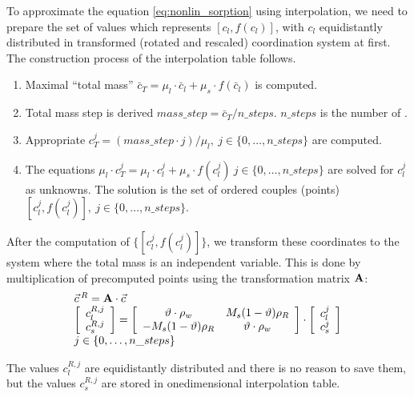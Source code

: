 To approximate the equation \eqref{eq:nonlin_sorption} using interpolation, we need to prepare the set of values 
which represents $[c_l, f(c_l)]$, with $c_l$ equidistantly distributed in transformed (rotated and rescaled) 
coordination system at first. The construction process of the interpolation table follows.
\begin{enumerate}
 \item Maximal ``total mass'' $\bar{c}_T = \mu_l\cdot \bar{c}_l + \mu_s\cdot f(\bar{c}_l)$ is computed.
 \item Total mass step is derived $mass\_step = \bar{c}_T/n\_steps$. $n\_steps$ is the number of
       .
 \item Appropriate $c_T^j = (mass\_step\cdot j)/\mu_l,~j\in \{0,\ldots, n\_steps\}$ are computed. 
 \item The equations $\mu_l \cdot c_T^j = \mu_l\cdot c_l^j + \mu_s\cdot f(c_l^j)~j\in \{0,\ldots, n\_steps\}$ are solved 
       for $c_l^j$ as unknowns. The solution is the set of ordered couples (points) 
       $[c_l^j,f(c_l^j)],~j\in\{0,\ldots,n\_steps\}$.
\end{enumerate}
After the computation of $\{[c_l^j,f(c_l^j)]\}$, we transform these coordinates to the system where the total mass is 
an independent variable. This is done by multiplication of precomputed points using the transformation matrix ${\bf A}$:
\begin{equation}
 \begin{array}{l}
  \vec{c}\,^R = {\bf A}\cdot\vec{c}\\
  \left[\begin{array}{c} c_l^{R,j}\\ c_s^{R,j} \end{array}\right] = 
  \left[\begin{array}{cc}
    \vartheta\cdot \rho_w & M_s(1 - \vartheta)\rho_R\\
    -M_s(1 - \vartheta)\rho_R & \vartheta\cdot \rho_w
  \end{array}\right]\cdot
  \left[\begin{array}{c} c_l^j\\ c_s^j \end{array}\right]\\
  j\in\{0,\ldots,n\_steps\}
 \end{array}
 \label{eq:transf_mat}
\end{equation}

The values $c_l^{R,j}$ are equidistantly distributed and there is no reason to save them, but the values 
$c_s^{R,j}$ are stored in onedimensional interpolation table.

